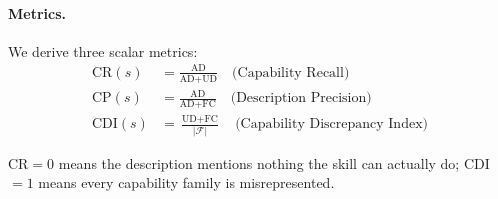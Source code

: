 \paragraph{Metrics.}
We derive three scalar metrics:
\begin{align}
\text{CR}(s) &= \frac{\text{AD}}{\text{AD}+\text{UD}} \label{eq:cr}
  \quad \text{(Capability Recall)}\\
\text{CP}(s) &= \frac{\text{AD}}{\text{AD}+\text{FC}} \label{eq:cp}
  \quad \text{(Description Precision)}\\
\text{CDI}(s) &= \frac{\text{UD}+\text{FC}}{|\mathcal{F}|} \label{eq:cdi}
  \quad \text{(Capability Discrepancy Index)}
\end{align}

CR$=0$ means the description mentions nothing the skill can actually do;
CDI$=1$ means every capability family is misrepresented.
